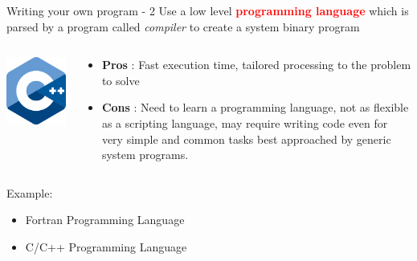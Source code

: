 \documentclass[unknownkeysallowed, 10pt, a4 paper, handout]{beamer}
\begin{document}
\begin{frame}[label=compiled]{Writing your own program - 2}
  Use a low level \textcolor{red}{\textbf{programming language}} which is
  parsed by a program called \textit{compiler} to create a system binary
  program
  \begin{columns}[T]
    \begin{column}{.23\textwidth}
      \includegraphics[scale=0.35]{pics/225px-ISO_C++_Logo.png}
    \end{column}
    \hfill
    \begin{column}{.76\textwidth}
      \begin{itemize}
        \item \textbf{Pros} : Fast execution time, tailored processing to the
          problem to solve
        \item \textbf{Cons} : Need to learn a programming language, not as
          flexible as a scripting language, may require writing code even
          for very simple and common tasks best approached by generic 
          system programs.
      \end{itemize}
    \end{column}
  \end{columns}
  Example:
  \begin{itemize}
    \item Fortran Programming Language
    \item C/C++ Programming Language
  \end{itemize}
\end{frame}
\end{document}
